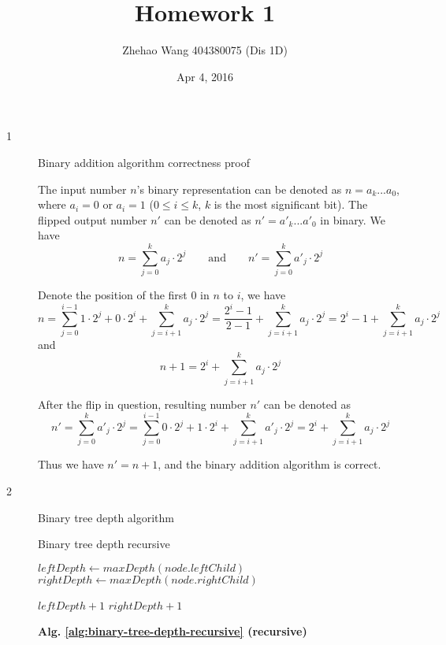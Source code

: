 \documentclass{article}
\title{Homework 1}
\author{Zhehao Wang 404380075 (Dis 1D)}
\date{Apr 4, 2016}
\begin{document}
\maketitle

\begin{description}

\item[1]{Binary addition algorithm correctness proof}
  
  The input number $n$'s binary representation can be denoted as $n=a_k...a_0$, where $a_i=0$ or $a_i=1$ ($0 \leq i \leq k$, $k$ is the most significant bit). The flipped output number $n'$ can be denoted as $n'=a'_k...a'_0$ in binary.
  We have 
  \[
  n = \sum_{j=0}^{k}{a_j \cdot 2^j}
  \qquad \text{and} \qquad 
  n' = \sum_{j=0}^{k}{a'_j \cdot 2^j}
  \]
  
  Denote the position of the first $0$ in $n$ to $i$, we have 
  $$n = \sum_{j=0}^{i-1}{1 \cdot 2^j} + 0 \cdot 2^i + \sum_{j=i+1}^{k}{a_j \cdot 2^j} = \frac{2^i-1}{2-1} + \sum_{j=i+1}^{k}{a_j \cdot 2^j} = 2^i - 1 + \sum_{j=i+1}^{k}{a_j \cdot 2^j}$$ 
  and
  $$n + 1 = 2^i + \sum_{j=i+1}^{k}{a_j \cdot 2^j}$$

  After the flip in question, resulting number $n'$ can be denoted as
  $$n' = \sum_{j=0}^{k}{a'_j \cdot 2^j} = \sum_{j=0}^{i-1}{0 \cdot 2^j} + 1 \cdot 2^i + \sum_{j=i+1}^{k}{a'_j \cdot 2^j} = 2^i + \sum_{j=i+1}^{k}{a_j \cdot 2^j}$$

  Thus we have $n' = n + 1$, and the binary addition algorithm is correct.

\item[2]{Binary tree depth algorithm}

  \begin{algorithm}[h]
  \caption{Binary tree depth recursive}
  \label{alg:binary-tree-depth-recursive}
    \begin{algorithmic}[1]
        \State {}
      \EndIf

      \State $leftDepth \gets maxDepth(node.leftChild)$
      \State $rightDepth \gets maxDepth(node.rightChild)$

        \State \Return $leftDepth + 1$
      \Else {} 
        \State \Return $rightDepth + 1$
      \EndIf
    \EndFunction
    \end{algorithmic}
  \end{algorithm}

  \textbf{Alg. \ref{alg:binary-tree-depth-recursive} (recursive)}


\end{description}
\end{document}
